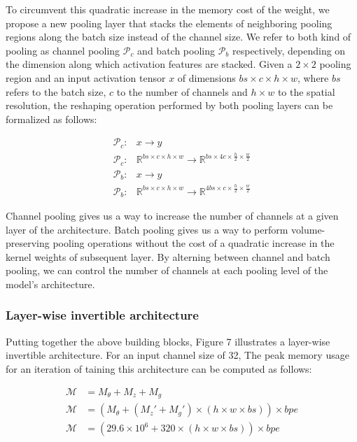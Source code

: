 \documentclass[twocolumn]{bmcart}
\begin{document}
To circumvent this quadratic increase in the memory cost of the weight, 
we propose a new pooling layer that stacks the elements of neighboring pooling regions along the batch size instead of the channel size. 
We refer to both kind of pooling as channel pooling $\mathcal{P}_c$ and batch pooling $\mathcal{P}_b$ respectively, 
depending on the dimension along which activation features are stacked.
Given a $2 \times 2$ pooling region and an input activation tensor $x$ of dimensions $bs \times c \times h \times w$, 
where $bs$ refers to the batch size, $c$ to the number of channels and $h \times w$ to the spatial resolution, 
the reshaping operation performed by both pooling layers can be formalized as follows:

\begin{subequations}
\begin{align}
	\mathcal{P}_c :& x \rightarrow y \\
	\mathcal{P}_c :& \mathbb{R}^{bs \times c \times h \times w}  \rightarrow \mathbb{R}^{bs \times 4c \times \frac{h}{2} \times \frac{w}{2}}\\
	\mathcal{P}_b :& x \rightarrow y \\
    \mathcal{P}_b :&  \mathbb{R}^{bs \times c \times h \times w}  \rightarrow \mathbb{R}^{4bs \times c \times \frac{h}{2} \times \frac{w}{2}}
\end{align}
\end{subequations}

Channel pooling gives us a way to increase the number of channels at a given layer of the architecture.
Batch pooling gives us a way to perform volume-preserving pooling operations without the cost of a quadratic increase in the kernel weights of subsequent layer.  
By alterning between channel and batch pooling, we can control the number of channels at each pooling level of the model's architecture.  

\subsubsection{Layer-wise invertible architecture}

Putting together the above building blocks, Figure 7 illustrates a layer-wise invertible architecture.
For an input channel size of 32, The peak memory usage for an iteration of taining this architecture can be computed as follows:

\begin{subequations}
\begin{align}
\mathcal{M} &= M_{\theta} + M_{z} + M_{g} \\
\mathcal{M} &= (M_{\theta} + (M_z' + M_{g}') \times (h \times w \times bs)) \times bpe \\
\mathcal{M} &= (29.6 \times 10^6 + 320 \times (h \times w \times bs)) \times bpe \\
\end{align}
\end{subequations}
\end{document}
